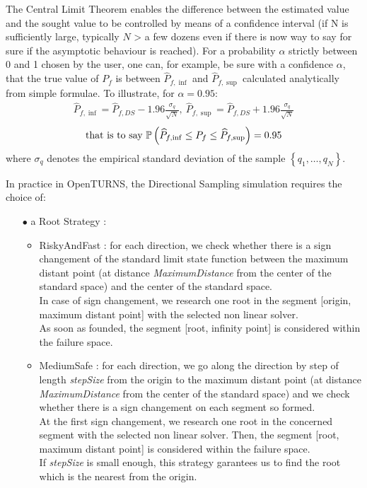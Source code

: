 {  The Central Limit Theorem enables the difference between the estimated value and the sought value to be controlled by means of a confidence interval (if N is sufficiently large, typically $N$ > a few dozens even if there is now way to say for sure if the asymptotic behaviour is reached). For a probability $\alpha$ strictly between 0 and 1 chosen by the user, one can, for example, be sure with a confidence $\alpha$, that the true value of $P_f$ is between $\widehat{P}_{f,\inf}$ and $\widehat{P}_{f,\sup}$ calculated analytically from simple formulae. To illustrate, for $\alpha = 0.95$:
  \begin{align*}
    \widehat{P}_{f,\inf} = \widehat{P}_{f,DS} - 1.96 \frac{\sigma_q}{\sqrt{N}},\ \widehat{P}_{f,\sup} = \widehat{P}_{f,DS} + 1.96 \frac{\sigma_q}{\sqrt{N}}
  \end{align*}
  \begin{align*}
    \textrm{that is to say}\ {\mathbb P}\left(  \widehat{P}_{f,\inf} \leq P_f \leq \widehat{P}_{f,\sup} \right) = 0.95
  \end{align*}
  where $\sigma_q$ denotes the empirical standard deviation of the sample $\left\{ q_1,\ldots,q_N \right\}$.

  In practice in OpenTURNS, the Directional Sampling simulation requires the choice of:
  \begin{itemize}
  \item[$\bullet$] a Root Strategy :
    \begin{itemize}
    \item  RiskyAndFast : for each direction, we check whether there is a sign changement of the standard limit state function between the maximum distant point (at distance {\itshape MaximumDistance} from the center of the standard space) and the center of the standard space. \\
      In case of sign changement, we research one root in the segment [origin, maximum distant point] with the selected non linear solver.\\
      As soon as founded, the segment [root, infinity point] is considered within the failure space.

    \item MediumSafe : for each direction, we go along the direction by step of length {\itshape stepSize} from the origin to the maximum distant point (at distance {\itshape MaximumDistance} from the center of the standard space) and we check whether there is a sign changement on each segment so formed.\\
      At the first sign changement, we research one root in the concerned segment with the selected non linear solver. Then, the segment [root, maximum distant point] is considered within the failure space. \\
      If {\itshape stepSize} is small enough, this strategy garantees us to find the root which is the nearest from the origin.


\end{itemize}
\end{itemize}}
